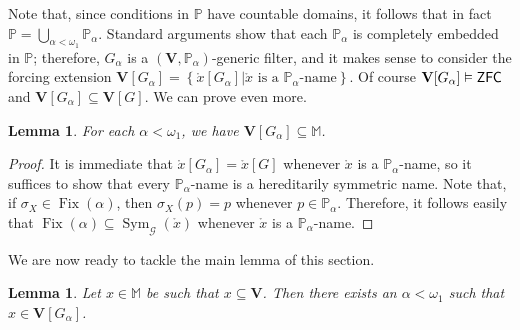 \documentclass[10pt]{amsart}
\newcommand{\zfc}{\mathnormal{\mathsf{ZFC}}}
\DeclareMathOperator{\fix}{Fix}
\DeclareMathOperator{\sym}{Sym}
\newtheorem{lemma}[theorem]{Lemma}
\theoremstyle{definition}
\theoremstyle{remark}
\begin{document}
Note that, since conditions in $\mathbb P$ have countable domains, it follows that in fact $\mathbb P=\bigcup_{\alpha<\omega_1}\mathbb P_\alpha$. Standard arguments show that each $\mathbb P_\alpha$ is completely embedded in $\mathbb P$; therefore, $G_\alpha$ is a $(\mathbf{V},\mathbb P_\alpha)$-generic filter, and it makes sense to consider the forcing extension $\mathbf{V}[G_\alpha]=\left\{\mathring{x}[G_\alpha]\big|\mathring{x}\text{ is a }\mathbb P_\alpha\text{-name}\right\}$. Of course $\mathbf{V}[G_\alpha]\vDash\zfc$ and $\mathbf{V}[G_\alpha]\subseteq\mathbf{V}[G]$. We can prove even more.

\begin{lemma}\label{lem:intermediate-extensions}
For each $\alpha<\omega_1$, we have $\mathbf{V}[G_\alpha]\subseteq\mathbb M$.
\end{lemma}

\begin{proof}
It is immediate that $\mathring{x}[G_\alpha]=\mathring{x}[G]$ whenever $\mathring{x}$ is a $\mathbb P_\alpha$-name, so it suffices to show that every $\mathbb P_\alpha$-name is a hereditarily symmetric name. Note that, if $\sigma_X\in\fix(\alpha)$, then $\sigma_X(p)=p$ whenever $p\in\mathbb P_\alpha$. Therefore, it follows easily that $\fix(\alpha)\subseteq\sym_{\mathcal G}(\mathring{x})$ whenever $\mathring{x}$ is a $\mathbb P_\alpha$-name.
\end{proof}

We are now ready to tackle the main lemma of this section.

\begin{lemma}\label{lemma_j_1}
Let $x\in\mathbb M$ be such that $x\subseteq\mathbf{V}$. Then there exists an $\alpha<\omega_1$ such that $x\in\mathbf{V}[G_\alpha]$.
\end{lemma}
\end{document}
